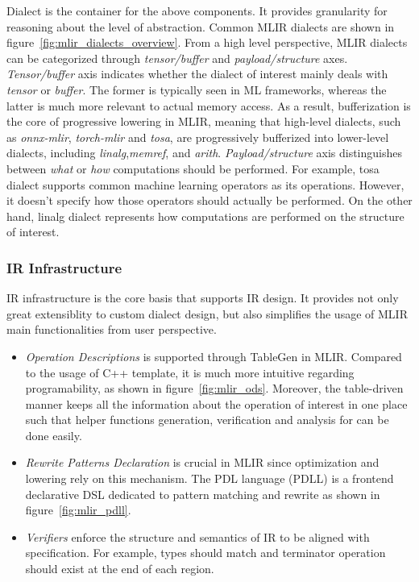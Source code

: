 Dialect is the container for the above components. It provides granularity for reasoning about the level of abstraction. Common MLIR dialects are shown in figure~\ref{fig:mlir_dialects_overview}. From a high level perspective, MLIR dialects can be categorized through \textit{tensor/buffer} and \textit{payload/structure} axes. \textit{Tensor/buffer} axis indicates whether the dialect of interest mainly deals with \textit{tensor} or \textit{buffer}. The former is typically seen in ML frameworks, whereas the latter is much more relevant to actual memory access. As a result, bufferization is the core of progressive lowering in MLIR, meaning that high-level dialects, such as \textit{onnx-mlir}, \textit{torch-mlir} and \textit{tosa}, are progressively bufferized into lower-level dialects, including \textit{linalg},\textit{memref}, and \textit{arith}. \textit{Payload/structure} axis distinguishes between \textit{what} or \textit{how} computations should be performed. For example, tosa dialect supports common machine learning operators as its operations. However, it doesn't specify how those operators should actually be performed. On the other hand, linalg dialect represents how computations are performed on the structure of interest.

\subsubsection{IR Infrastructure}

IR infrastructure is the core basis that supports IR design. It provides not only great extensiblity to custom dialect design, but also simplifies the usage of MLIR main functionalities from user perspective.

\begin{itemize}
    \item \textit{Operation Descriptions} is supported through TableGen in MLIR. Compared to the usage of C++ template, it is much more intuitive regarding programability, as shown in figure~\ref{fig:mlir_ods}. Moreover, the table-driven manner keeps all the information about the operation of interest in one place such that helper functions generation, verification and analysis for can be done easily.
    
    \item \textit{Rewrite Patterns Declaration} is crucial in MLIR since optimization and lowering rely on this mechanism. The PDL language (PDLL) is a frontend declarative DSL dedicated to pattern matching and rewrite as shown in figure~\ref{fig:mlir_pdll}.
    
    \item \textit{Verifiers} enforce the structure and semantics of IR to be aligned with specification. For example, types should match and terminator operation should exist at the end of each region.
\end{itemize}


